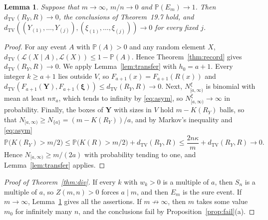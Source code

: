 \documentclass[11pt]{amsart}
\newtheorem{lemma}[theorem]{Lemma}
\theoremstyle{definition}
\theoremstyle{remark}
\numberwithin{equation}{section}
\newcommand{\Pp}{\mathbb P}
\newcommand{\cL}{\mathcal L}
\newcommand{\dtv}{d_{\mathrm{TV}}}
\newcommand{\bY}{\mathbf Y}
\newcommand{\bxi}{\boldsymbol\xi}
\begin{document}
\begin{lemma}\label{lem:full}
Suppose that $m\to\infty$, $m/n\to0$ and $\Pp(E_m)\to1$. Then $\dtv(R_Y,R)\to0$, the conclusions of Theorem~19.7 hold, and $\dtv((Y_{(1)},\dots,Y_{(j)}),(\xi_{(1)},\dots,\xi_{(j)}))\to0$ for every fixed $j$.
\end{lemma}

\begin{proof}
For any event $A$ with $\Pp(A)>0$ and any random element $X$, $\dtv(\cL(X\mid A),\cL(X))\le1-\Pp(A)$. Hence Theorem~\ref{thm:record} gives $\dtv(R_Y,R)\to0$. We apply Lemma~\ref{lem:transfer} with $h_0=a+1$. Every integer $k\ge a+1$ lies outside $V$, so $F_{a+1}(x)=F_{a+1}(R(x))$ and $\dtv(F_{a+1}(\bY),F_{a+1}(\bxi))\le\dtv(R_Y,R)\to0$. Next, $N^\xi_{[a,\infty)}$ is binomial with mean at least $n\pi_a$, which tends to infinity by \eqref{eq:asym}, so $N^\xi_{[a,\infty)}\to\infty$ in probability. Finally, the boxes of $\bY$ with sizes in $V$ hold $m-K(R_Y)$ balls, so that $N_{[a,\infty)}\ge N_{\{a\}}=(m-K(R_Y))/a$, and by Markov's inequality and \eqref{eq:asym}
\[
\Pp\bigl(K(R_Y)>m/2\bigr)\le\Pp\bigl(K(R)>m/2\bigr)+\dtv(R_Y,R)\le\frac{2n\kappa}m+\dtv(R_Y,R)\to0.
\]
Hence $N_{[a,\infty)}\ge m/(2a)$ with probability tending to one, and Lemma~\ref{lem:transfer} applies.
\end{proof}

\begin{proof}[Proof of Theorem~\ref{thm:div}]
If every $k$ with $w_k>0$ is a multiple of $a$, then $S_n$ is a multiple of $a$, so $Z(m,n)>0$ forces $a\mid m$, and then $E_m$ is the sure event. If $m\to\infty$, Lemma~\ref{lem:full} gives all the assertions. If $m\not\to\infty$, then $m$ takes some value $m_0$ for infinitely many $n$, and the conclusions fail by Proposition~\ref{prop:fail}(a).
\end{proof}
\end{document}
